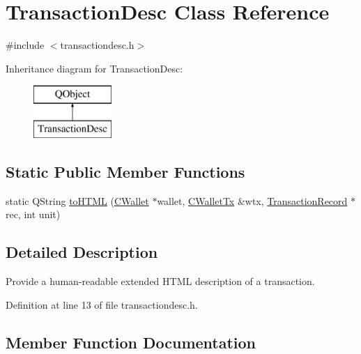 \hypertarget{class_transaction_desc}{}\section{Transaction\+Desc Class Reference}
\label{class_transaction_desc}


{\ttfamily \#include $<$transactiondesc.\+h$>$}

Inheritance diagram for Transaction\+Desc\+:\begin{figure}[H]
\begin{center}
\leavevmode
\includegraphics[height=2.000000cm]{class_transaction_desc}
\end{center}
\end{figure}
\subsection*{Static Public Member Functions}
\begin{DoxyCompactItemize}
\item 
static Q\+String \hyperlink{class_transaction_desc_ab7c9dbb2048aae121dd9d75df86e64f4}{to\+H\+T\+M\+L} (\hyperlink{class_c_wallet}{C\+Wallet} $\ast$wallet, \hyperlink{class_c_wallet_tx}{C\+Wallet\+Tx} \&wtx, \hyperlink{class_transaction_record}{Transaction\+Record} $\ast$rec, int unit)
\end{DoxyCompactItemize}


\subsection{Detailed Description}
Provide a human-\/readable extended H\+T\+M\+L description of a transaction. 

Definition at line 13 of file transactiondesc.\+h.



\subsection{Member Function Documentation}
\hypertarget{class_transaction_desc_ab7c9dbb2048aae121dd9d75df86e64f4}{}
